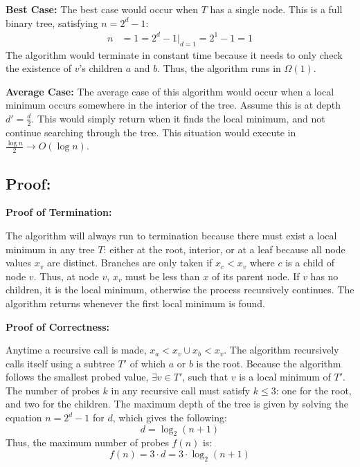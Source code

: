 \documentclass{article}
\begin{document}
\noindent \textbf{Best Case:}
The best case would occur when $T$ has a single node.  This is a full binary tree, satisfying $n = 2^d - 1$:  
\begin{align*}
n &= 1 = 2^d - 1 |_{d = 1} = 2^1 - 1 = 1
\end{align*}
The algorithm would terminate in constant time because it needs to only check the existence of $v$'s children $a$ and $b$.
Thus, the algorithm runs in $\Omega(1)$.

\noindent \textbf{Average Case:}
The average case of this algorithm would occur when a local minimum occurs somewhere in the interior of the tree.  Assume this is at depth $d' = \frac{d}{2}$.  This would simply return when it finds the local minimum, and not continue searching through the tree.
This situation would execute in $\frac{\log{n}}{2} \rightarrow O(\log{n})$.

\subsection*{Proof:}

\noindent \textbf{Proof of Termination:}

The algorithm will always run to termination because there must exist a local minimum in any tree $T$: either at the root, interior, or at a leaf because all node values $x_v$ are distinct.  Branches are only taken if $x_c < x_v$ where $c$ is a child of node $v$.  Thus, at node $v$, $x_v$ must be less than $x$ of its parent node.  If $v$ has no children, it is the local minimum, otherwise the process recursively continues.  The algorithm returns whenever the first local minimum is found.

\noindent \textbf{Proof of Correctness:}

Anytime a recursive call is made, $x_a < x_v \cup x_b < x_v$.  The algorithm recursively calls itself using a subtree $T'$ of which $a$ or $b$ is the root.  Because the algorithm follows the smallest probed value, $\exists v \in T'$, such that $v$ is a local minimum of $T'$. \newline
The number of probes $k$ in any recursive call must satisfy $k \leq 3$:  one for the root, and two for the children.  The maximum depth of the tree is given by solving the equation $n = 2^d - 1$ for $d$, which gives the following:
\begin{equation}
d = \log_2{(n + 1)}
\end{equation}
Thus, the maximum number of probes $f(n)$ is:
\begin{equation}
f(n) = 3 \cdot d = 3 \cdot \log_2{ (n+1) }
\end{equation}
\end{document}
